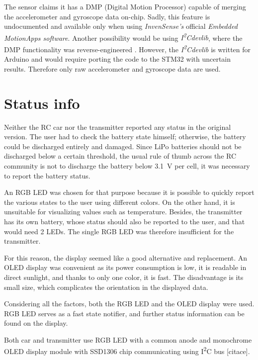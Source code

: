 The sensor claims it has a DMP (Digital Motion Processor) capable of merging the accelerometer and gyroscope data on-chip. Sadly, this feature is undocumented and available only when using \textit{InvenSense's} official \textit{Embedded MotionApps software}. Another possibility would be using \textit{I\textsuperscript{2}Cdevlib}, where the DMP functionality was reverse-engineered \cite{i2cdevlib}. However, the \textit{I\textsuperscript{2}Cdevlib} is written for Arduino and would require porting the code to the STM32 with uncertain results. Therefore only raw accelerometer and gyroscope data are used.

\section{Status info}
\label{hw_status}
Neither the RC car nor the transmitter reported any status in the original version. The user had to check the battery state himself; otherwise, the battery could be discharged entirely and damaged. Since LiPo batteries should not be discharged below a certain threshold, the usual rule of thumb across the RC community is not to discharge the battery below \SI{3.1}{\V} per cell, it was necessary to report the battery status.

An RGB LED was chosen for that purpose because it is possible to quickly report the various states to the user using different colors. On the other hand, it is unsuitable for visualizing values such as temperature. Besides, the transmitter has its own battery, whose status should also be reported to the user, and that would need 2 LEDs. The single RGB LED was therefore insufficient for the transmitter.

For this reason, the display seemed like a good alternative and replacement. An OLED display was convenient as its power consumption is low, it is readable in direct sunlight, and thanks to only one color, it is fast. The disadvantage is its small size, which complicates the orientation in the displayed data.

Considering all the factors, both the RGB LED and the OLED display were used. RGB LED serves as a fast state notifier, and further status information can be found on the display.

Both car and transmitter use RGB LED with a common anode and monochrome OLED display module with SSD1306 chip communicating using I\textsuperscript{2}C bus [\todo citace].



